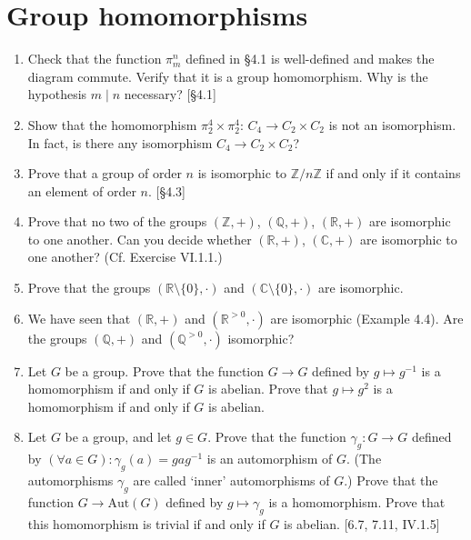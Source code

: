 \section{Group homomorphisms}
\begin{enumerate}
    \item Check that the function $\pi_m^n$ defined in \S4.1 is well-defined and makes the diagram commute. Verify that it is a group homomorphism. Why is the hypothesis $m \mid n$ necessary? [\S4.1]

    \item Show that the homomorphism $\pi_2^4 \times \pi_2^4$: $C_4 \to C_2 \times C_2$ is not an isomorphism. In fact, is there any isomorphism $C_4 \to C_2 \times C_2$?

    \item Prove that a group of order $n$ is isomorphic to $\mathbb{Z}/n\mathbb{Z}$ if and only if it contains an element of order $n$. [\S4.3]

    \item Prove that no two of the groups $(\mathbb{Z}, +)$, $(\mathbb{Q}, +)$, $(\mathbb{R}, +)$ are isomorphic to one another. Can you decide whether $(\mathbb{R}, +)$, $(\mathbb{C}, +)$ are isomorphic to one another? (Cf. Exercise VI.1.1.)

    \item Prove that the groups $(\mathbb{R} \setminus \{0\}, \cdot)$ and $(\mathbb{C} \setminus \{0\}, \cdot)$ are isomorphic.

    \item We have seen that $(\mathbb{R}, +)$ and $(\mathbb{R}^{>0}, \cdot)$ are isomorphic (Example 4.4). Are the groups $(\mathbb{Q}, +)$ and $(\mathbb{Q}^{>0}, \cdot)$ isomorphic?

    \item Let $G$ be a group. Prove that the function $G \to G$ defined by $g \mapsto g^{-1}$ is a homomorphism if and only if $G$ is abelian. Prove that $g \mapsto g^2$ is a homomorphism if and only if $G$ is abelian.

    \item Let $G$ be a group, and let $g \in G$. Prove that the function $\gamma_g: G \to G$ defined by $(\forall a \in G): \gamma_g(a) = gag^{-1}$ is an automorphism of $G$. (The automorphisms $\gamma_g$ are called `inner' automorphisms of $G$.) Prove that the function $G \to \text{Aut}(G)$ defined by $g \mapsto \gamma_g$ is a homomorphism. Prove that this homomorphism is trivial if and only if $G$ is abelian. [6.7, 7.11, IV.1.5]


\end{enumerate}
